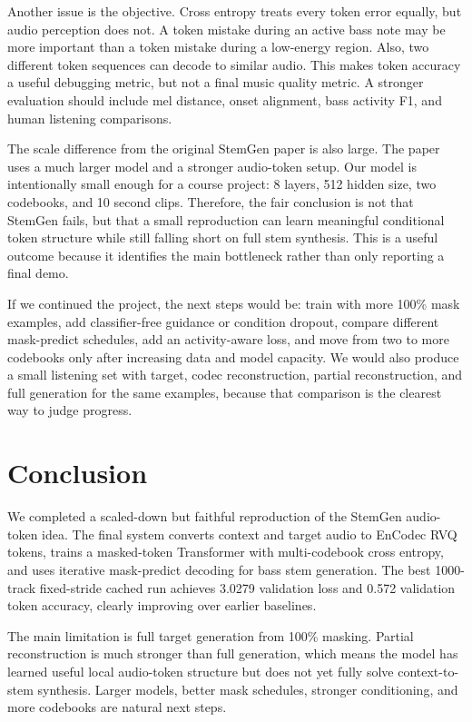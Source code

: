 \documentclass{article}
\begin{document}
Another issue is the objective. Cross entropy treats every token error equally, but audio perception does not. A token mistake during an active bass note may be more important than a token mistake during a low-energy region. Also, two different token sequences can decode to similar audio. This makes token accuracy a useful debugging metric, but not a final music quality metric. A stronger evaluation should include mel distance, onset alignment, bass activity F1, and human listening comparisons.

The scale difference from the original StemGen paper is also large. The paper uses a much larger model and a stronger audio-token setup. Our model is intentionally small enough for a course project: 8 layers, 512 hidden size, two codebooks, and 10 second clips. Therefore, the fair conclusion is not that StemGen fails, but that a small reproduction can learn meaningful conditional token structure while still falling short on full stem synthesis. This is a useful outcome because it identifies the main bottleneck rather than only reporting a final demo.

If we continued the project, the next steps would be: train with more 100\% mask examples, add classifier-free guidance or condition dropout, compare different mask-predict schedules, add an activity-aware loss, and move from two to more codebooks only after increasing data and model capacity. We would also produce a small listening set with target, codec reconstruction, partial reconstruction, and full generation for the same examples, because that comparison is the clearest way to judge progress.

\section{Conclusion}

We completed a scaled-down but faithful reproduction of the StemGen audio-token idea. The final system converts context and target audio to EnCodec RVQ tokens, trains a masked-token Transformer with multi-codebook cross entropy, and uses iterative mask-predict decoding for bass stem generation. The best 1000-track fixed-stride cached run achieves 3.0279 validation loss and 0.572 validation token accuracy, clearly improving over earlier baselines.

The main limitation is full target generation from 100\% masking. Partial reconstruction is much stronger than full generation, which means the model has learned useful local audio-token structure but does not yet fully solve context-to-stem synthesis. Larger models, better mask schedules, stronger conditioning, and more codebooks are natural next steps.
\end{document}
